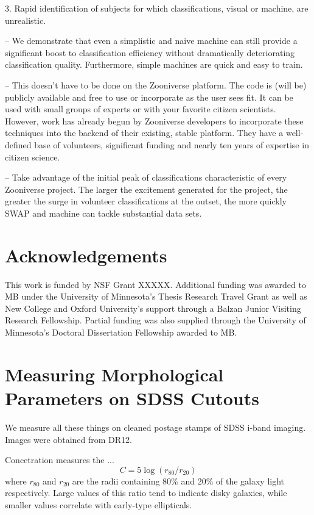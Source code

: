 \documentclass[twocolumn]{aastex6}
\newcommand{\rr}[1]{$r_{#1}$}
\begin{document}
3. Rapid identification of subjects for which classifications, visual or machine, are
unrealistic. 


-- We demonstrate that even a simplistic and naive machine can still provide a 
significant boost to classification efficiency without dramatically deteriorating 
classification quality. Furthermore, simple machines are quick and easy to train. 

-- This doesn't have to be done on the Zooniverse platform. The code is (will be) 
publicly available and free to use or incorporate as the user sees fit. It can be used
with small groups of experts or with your favorite citizen scientists. However, 
work has already begun by Zooniverse developers to incorporate these techniques
into the backend of their existing, stable platform. They have a well-defined base 
of volunteers, significant funding and nearly ten years of expertise in citizen science. 


-- Take advantage of the initial peak of classifications characteristic of every
Zooniverse project. The larger the excitement generated for the project, the greater
the surge in volunteer classifications at the outset, the more quickly SWAP and
machine can tackle substantial data sets. 

\section{Acknowledgements}
This work is funded by NSF Grant XXXXX. Additional funding was awarded to MB 
under the University of Minnesota's Thesis Research Travel Grant as well as
New College and Oxford University's support through a Balzan Junior Visiting 
Research Fellowship. Partial funding was also supplied through the University of
Minnesota's Doctoral Dissertation Fellowship awarded to MB. 






\appendix

\section{Measuring Morphological Parameters on SDSS Cutouts}
\label{sec:Appendix}

We measure all these things on cleaned postage stamps of SDSS i-band imaging. 
Images were obtained from DR12. 


Concetration measures the ... 
\begin{equation}
C = 5\log(r_{80}/ r_{20})
\end{equation}
where \rr{80} and \rr{20} are the radii containing 80\% and 20\% of the galaxy light respectively.  Large values of this ratio tend to indicate disky galaxies, while smaller values correlate with early-type ellipticals. 
\end{document}
